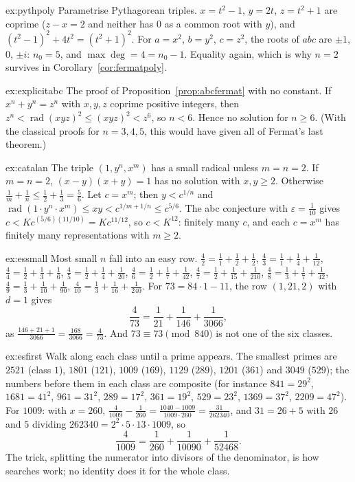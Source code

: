 \begin{solution}{ex:pythpoly}
\idea Parametrise Pythagorean triples.
\writeup $x=t^2-1$, $y=2t$, $z=t^2+1$ are coprime ($z-x=2$ and neither has $0$ as a common root with $y$), and
$(t^2-1)^2+4t^2=(t^2+1)^2$. For $a=x^2$, $b=y^2$, $c=z^2$, the roots of $abc$ are $\pm1$, $0$, $\pm i$: $n_0=5$, and $\max\deg=4=n_0-1$. Equality again,
which is why $n=2$ survives in Corollary~\ref{cor:fermatpoly}.
\end{solution}

\begin{solution}{ex:explicitabc}
\idea The proof of Proposition~\ref{prop:abcfermat} with no constant.
\writeup If $x^n+y^n=z^n$ with $x,y,z$ coprime positive integers, then $z^n<\operatorname{rad}(xyz)^2\le(xyz)^2<z^6$, so $n<6$. Hence no solution for
$n\ge6$. (With the classical proofs for $n=3,4,5$, this would have given all of Fermat's last theorem.)
\end{solution}

\begin{solution}{ex:catalan}
\idea The triple $(1,y^n,x^m)$ has a small radical unless $m=n=2$.
\writeup If $m=n=2$, $(x-y)(x+y)=1$ has no solution with $x,y\ge2$. Otherwise $\frac1m+\frac1n\le\frac12+\frac13=\frac56$. Let $c=x^m$; then $y<c^{1/n}$ and
$\operatorname{rad}(1\cdot y^n\cdot x^m)\le xy<c^{1/m+1/n}\le c^{5/6}$. The abc conjecture with $\varepsilon=\frac1{10}$ gives $c<Kc^{(5/6)(11/10)}=Kc^{11/12}$,
so $c<K^{12}$: finitely many $c$, and each $c=x^m$ has finitely many representations with $m\ge2$.
\end{solution}

\begin{solution}{ex:essmall}
\idea Most small $n$ fall into an easy row.
\writeup $\frac42=\frac11+\frac12+\frac12$, $\frac43=\frac11+\frac14+\frac1{12}$, $\frac44=\frac12+\frac13+\frac16$, $\frac45=\frac12+\frac14+\frac1{20}$,
$\frac46=\frac12+\frac17+\frac1{42}$, $\frac47=\frac12+\frac1{15}+\frac1{210}$, $\frac48=\frac13+\frac17+\frac1{42}$, $\frac49=\frac13+\frac1{10}+\frac1{90}$,
$\frac4{10}=\frac13+\frac1{16}+\frac1{240}$. For $73=84\cdot1-11$, the row $(1,21,2)$ with $d=1$ gives
\[
\frac4{73}=\frac1{21}+\frac1{146}+\frac1{3066},
\]
as $\frac{146+21+1}{3066}=\frac{168}{3066}=\frac4{73}$. And $73\equiv73\pmod{840}$ is not one of the six classes.
\end{solution}

\begin{solution}{ex:esfirst}
\idea Walk along each class until a prime appears.
\writeup The smallest primes are $2521$ (class $1$), $1801$ ($121$), $1009$ ($169$), $1129$ ($289$), $1201$ ($361$) and $3049$ ($529$); the numbers
before them in each class are composite (for instance $841=29^2$, $1681=41^2$, $961=31^2$, $289=17^2$, $361=19^2$, $529=23^2$, $1369=37^2$, $2209=47^2$).
For $1009$: with $x=260$, $\frac4{1009}-\frac1{260}=\frac{1040-1009}{1009\cdot260}=\frac{31}{262340}$, and $31=26+5$ with $26$ and $5$ dividing
$262340=2^2\cdot5\cdot13\cdot1009$, so
\[
\frac4{1009}=\frac1{260}+\frac1{10090}+\frac1{52468}.
\]
The trick, splitting the numerator into divisors of the denominator, is how searches work; no identity does it for the whole class.
\end{solution}


